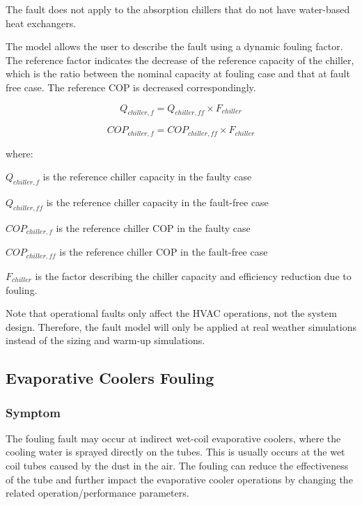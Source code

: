 The fault does not apply to the absorption chillers that do not have water-based heat exchangers. 

The model allows the user to describe the fault using a dynamic fouling factor. The reference factor indicates the decrease of the reference capacity of the chiller, which is the ratio between the nominal capacity at fouling case and that at fault free case. The reference COP is decreased correspondingly.

\begin{equation}
Q_{chiller,f} = Q_{chiller,ff} \times F_{chiller}
\end{equation}

\begin{equation}
COP_{chiller,f} = COP_{chiller,ff} \times F_{chiller}
\end{equation}

where:

\(Q_{chiller,f}\) is the reference chiller capacity in the faulty case

\(Q_{chiller,ff}\) is the reference chiller capacity in the fault-free case

\(COP_{chiller,f}\) is the reference chiller COP in the faulty case

\(COP_{chiller,ff}\) is the reference chiller COP in the fault-free case

\(F_{chiller}\) is the factor describing the chiller capacity and efficiency reduction due to fouling.

Note that operational faults only affect the HVAC operations, not the system design. Therefore, the fault model will only be applied at real weather simulations instead of the sizing and warm-up simulations.


\subsection{Evaporative Coolers Fouling}\label{evaporative-cooler-fouling}

\subsubsection{Symptom}

The fouling fault may occur at indirect wet-coil evaporative coolers, where the cooling water is sprayed directly on the tubes. This is usually occurs at the wet coil tubes caused by the dust in the air. The fouling can reduce the effectiveness of the tube and further impact the evaporative cooler operations by changing the related operation/performance parameters.

